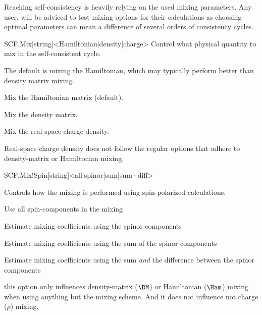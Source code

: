 Reaching self-consistency is heavily relying on the used mixing
parameters.
Any user, will be adviced to test mixing options for their
calculations as choosing optimal parameters can mean a difference of
several orders of consistency cycles. 


\begin{fdfentry}{SCF.Mix}[string]<Hamiltonian|density|charge>
  Control what physical quantity to mix in the self-consistent cycle.

  The default is mixing the Hamiltonian, which may typically perform
  better than density matrix mixing. 

  \begin{fdfoptions}
    \option[Hamiltonian]%
    Mix the Hamiltonian matrix (default).

    \option[density]%
    Mix the density matrix.

    \option[charge]%
    Mix the real-space charge density.
    
  \end{fdfoptions}
  
  \note Real-space charge density does not follow the regular options
  that adhere to density-matrix or Hamiltonian mixing.

\end{fdfentry}

\begin{fdfentry}{SCF.Mix!Spin}[string]<all|spinor|sum|sum+diff>

  Controls how the mixing is performed using spin-polarized
  calculations. 
  
  \begin{fdfoptions}
    \option[all] %
    Use all spin-components in the mixing

    \option[spinor] %
    Estimate mixing coefficients using the spinor components

    \option[sum] %
    Estimate mixing coefficients using the sum of the spinor
    components 

    Estimate mixing coefficients using the sum \emph{and} the
    difference between the spinor components 
  \end{fdfoptions}

  \note this option only influences density-matrix ($\DM$) or
  Hamiltonian ($\Ham$) mixing when using anything but the
   mixing scheme. And it does not influence not charge
  ($\rho$) mixing.
  
\end{fdfentry}

